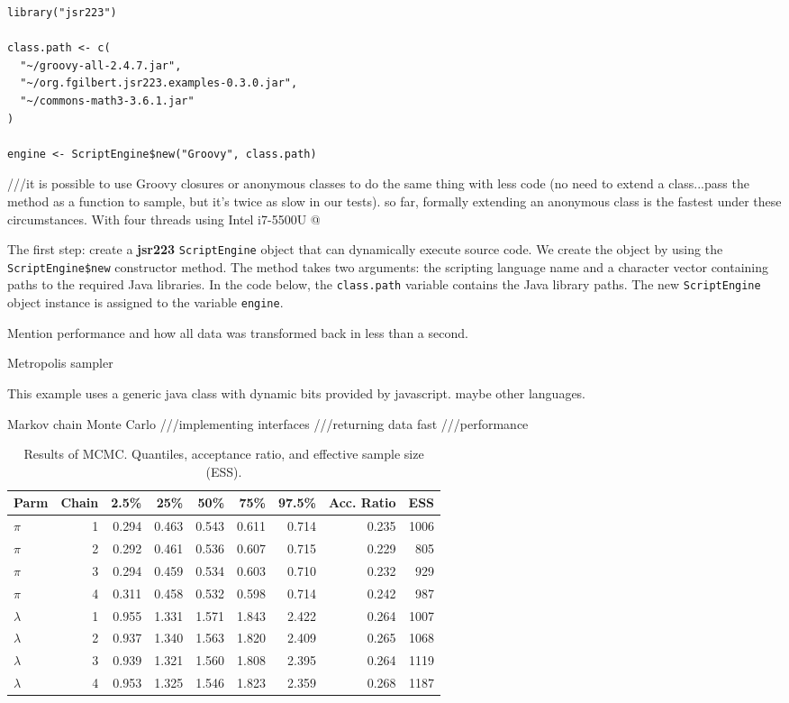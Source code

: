 \documentclass[
article,
11pt, %
a4paper, %
oneside, %
headinclude,footinclude, %
]{scrartcl}
\theoremstyle{definition} %
\theoremstyle{plain} %
\theoremstyle{remark} %
\newcommand{\pkg}[1]{\textbf{#1}}
\newcommand{\code}[1]{\texttt{#1}}
\begin{document}
\begin{verbatim}
library("jsr223")

class.path <- c(
  "~/groovy-all-2.4.7.jar",
  "~/org.fgilbert.jsr223.examples-0.3.0.jar",
  "~/commons-math3-3.6.1.jar"
)

engine <- ScriptEngine$new("Groovy", class.path)
\end{verbatim}



///it is possible to use Groovy closures or anonymous classes to do the same thing with less code (no need to extend a class...pass the method as a function to sample, but it's twice as slow in our tests). so far, formally extending an anonymous class is the fastest under these circumstances.
With four threads using Intel i7-5500U @

The first step: create a \pkg{jsr223} \code{ScriptEngine} object that can dynamically execute source code. We create the object by using the \code{ScriptEngine\$new} constructor method. The method takes two arguments: the scripting language name and a character vector containing paths to the required Java libraries. In the code below, the \code{class.path} variable contains the Java library paths. The new \code{ScriptEngine} object instance is assigned to the variable \code{engine}.

Mention performance and how all data was transformed back in less than a second.

Metropolis sampler

This example uses a generic java class with dynamic bits provided by javascript. maybe other languages.

Markov chain Monte Carlo 
///implementing interfaces
///returning data fast
///performance

\begin{table}[h]
\centering
\label{tab:mcmc}
\caption{Results of MCMC. Quantiles, acceptance ratio, and effective sample size (ESS).}  %
\begin{tabular}{lrrrrrrrr}
\hline
Parm & Chain & 2.5\% & 25\% & 50\% & 75\% & 97.5\% & Acc. Ratio & ESS \\ 
\hline
$\pi$ &    1 & 0.294 & 0.463 & 0.543 & 0.611 & 0.714 & 0.235 & 1006 \\ 
$\pi$ &    2 & 0.292 & 0.461 & 0.536 & 0.607 & 0.715 & 0.229 &  805 \\ 
$\pi$ &    3 & 0.294 & 0.459 & 0.534 & 0.603 & 0.710 & 0.232 &  929 \\ 
$\pi$ &    4 & 0.311 & 0.458 & 0.532 & 0.598 & 0.714 & 0.242 &  987 \\ 
$\lambda$ &    1 & 0.955 & 1.331 & 1.571 & 1.843 & 2.422 & 0.264 & 1007 \\ 
$\lambda$ &    2 & 0.937 & 1.340 & 1.563 & 1.820 & 2.409 & 0.265 & 1068 \\ 
$\lambda$ &    3 & 0.939 & 1.321 & 1.560 & 1.808 & 2.395 & 0.264 & 1119 \\ 
$\lambda$ &    4 & 0.953 & 1.325 & 1.546 & 1.823 & 2.359 & 0.268 & 1187 \\ 
\hline
\end{tabular}
\end{table}
\end{document}
